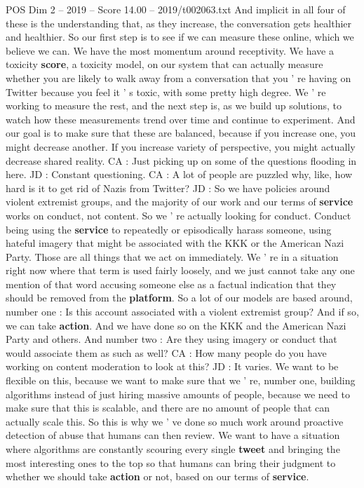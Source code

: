\begin{textsample}{POS Dim 2 – 2019 – Score 14.00 – 2019/t002063.txt}
And implicit in all four of these is the understanding that, as they increase, the conversation gets healthier and healthier.
So our first step is to see if we can measure these online, which we believe we can.
We have the most momentum around receptivity.
We have a toxicity \textbf{score}, a toxicity model, on our system that can actually measure whether you are likely to walk away from a conversation that you ' re having on Twitter because you feel it ' s toxic, with some pretty high degree.
We ' re working to measure the rest, and the next step is, as we build up solutions, to watch how these measurements trend over time and continue to experiment.
And our goal is to make sure that these are balanced, because if you increase one, you might decrease another.
If you increase variety of perspective, you might actually decrease shared reality.
CA : Just picking up on some of the questions flooding in here.
JD : Constant questioning.
CA : A lot of people are puzzled why, like, how hard is it to get rid of Nazis from Twitter?
JD : So we have policies around violent extremist groups, and the majority of our work and our terms of \textbf{service} works on conduct, not content.
So we ' re actually looking for conduct.
Conduct being using the \textbf{service} to repeatedly or episodically harass someone, using hateful imagery that might be associated with the KKK or the American Nazi Party.
Those are all things that we act on immediately.
We ' re in a situation right now where that term is used fairly loosely, and we just cannot take any one mention of that word accusing someone else as a factual indication that they should be removed from the \textbf{platform}.
So a lot of our models are based around, number one : Is this account associated with a violent extremist group?
And if so, we can take \textbf{action}.
And we have done so on the KKK and the American Nazi Party and others.
And number two : Are they using imagery or conduct that would associate them as such as well?
CA : How many people do you have working on content moderation to look at this?
JD : It varies.
We want to be flexible on this, because we want to make sure that we ' re, number one, building algorithms instead of just hiring massive amounts of people, because we need to make sure that this is scalable, and there are no amount of people that can actually scale this.
So this is why we ' ve done so much work around proactive detection of abuse that humans can then review.
We want to have a situation where algorithms are constantly scouring every single \textbf{tweet} and bringing the most interesting ones to the top so that humans can bring their judgment to whether we should take \textbf{action} or not, based on our terms of \textbf{service}.

\end{textsample}
